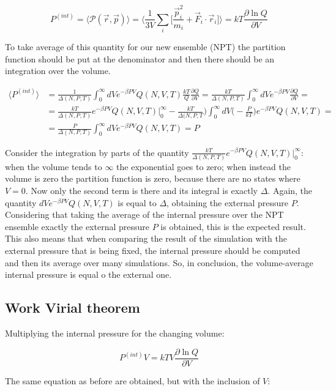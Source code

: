 	$$P^{(int)} =\langle\mathcal{P}(\vec{r}, \vec{p})\rangle = \biggl\langle\frac{1}{3V}\sum\limits_i\biggl[\frac{\vec{p}_i^2}{m_i} + \vec{F}_i\cdot\vec{r}_i\biggr]\biggr\rangle = kT\frac{\partial\ln Q}{\partial V}$$

	To take average of this quantity for our new ensemble (NPT) the partition function should be put at the denominator and then there should be an integration over the volume.

	\begin{align*}
		\langle P^{(int)}\rangle &= \frac{1}{\Delta(N, P, T)}\int_0^{\infty}dVe^{-\beta PV}Q(N, V, T)\frac{kT}{Q}\frac{\partial Q}{\partial V} = \frac{kT}{\Delta(N, P, T)}\int_0^{\infty}dVe^{-\beta PV}\frac{\partial Q}{\partial V}=\\
														 &= \frac{kT}{\Delta(N, P, T)}e^{-\beta PV}Q(N, V, T)|_0^{\infty}-\frac{kT}{\Delta(N, P, T})\int_0^{\infty}dV\biggl(-\frac{P}{kT}\biggr)e^{-\beta PV}Q(N, V, T) = \\
														 &=\frac{P}{\Delta(N, P, T)}\int_0^{\infty}dVe^{-\beta PV}Q(N, V, T) = P
	\end{align*}

	Consider the integration by parts of the quantity $\frac{kT}{\Delta(N, P, T)}e^{-\beta PV}Q(N, V, T)|_0^{\infty}$: when the volume tends to $\infty$ the exponential goes to zero; when instead the volume is zero the partition function is zero, because there are no states where $V=0$.
	Now only the second term is there and its integral is exactly $\Delta$.
	Again, the quantity $dVe^{-\beta PV}Q(N, V, T)$ is equal to $\Delta$, obtaining the external pressure $P$.
	Considering that taking the average of the internal pressure over the NPT ensemble exactly the external pressure $P$ is obtained, this is the expected result.
	 This also means that when comparing the result of the simulation with the external pressure that is being fixed, the internal pressure should be computed and then its average over many simulations.
	 So, in conclusion, the volume-average internal pressure is equal o the external one.

	\subsection{Work Virial theorem}
	Multiplying the internal pressure for the changing volume:

	$$P^{(int)}V = kTV\frac{\partial \ln Q}{\partial V}$$

	The same equation as before are obtained, but with the inclusion of $V$:

